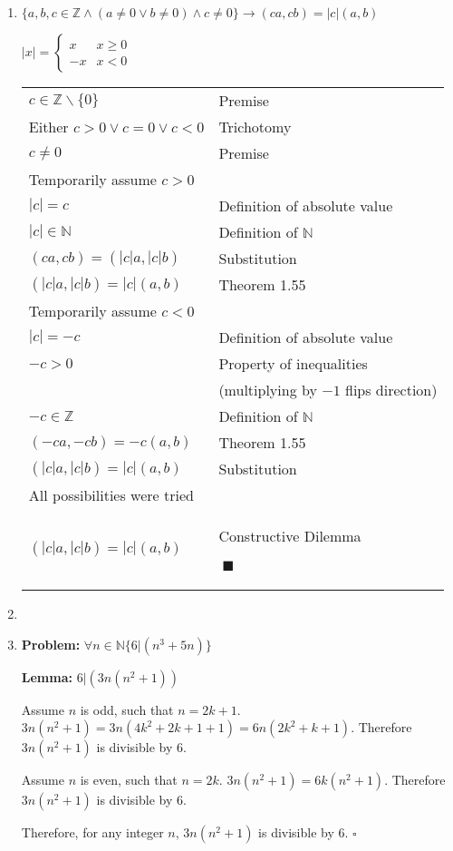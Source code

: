 \documentclass[12pt,letterpaper]{article}
\makeatletter
\newenvironment{proof}{
\mbox{}\vspace*{-1.68\baselineskip}
\begin{longtable}[l]{@{} l l}
}{
\tiny {$~\blacksquare$}
\end{longtable}
}
\makeatother
\begin{document}
\begin{enumerate}[leftmargin=0cm]
\item
$\{a, b, c \in \mathbb{Z} \wedge (a \neq 0 \vee b \neq 0) \wedge c \neq 0\} \rightarrow (ca, cb) = |c|(a, b)$

$|x| = \left \{ \begin{array}{cc} x & x \geq 0 \\ -x & x < 0\end{array} \right. $

\begin{proof}
$c \in \mathbb{Z} \backslash \{0\}$ & Premise \\
Either $c>0 \vee c = 0 \vee c < 0$ & Trichotomy \\
$c \neq 0$ & Premise \\
Temporarily assume $c > 0$ \\
$|c| = c$ & Definition of absolute value \\
$|c| \in \mathbb{N}$ & Definition of $\mathbb{N}$ \\
$(ca, cb) = (|c|a, |c|b)$ & Substitution \\
$(|c|a, |c|b) = |c|(a, b)$ & Theorem 1.55 \\
Temporarily assume $c < 0$ \\
$|c| = -c$ & Definition of absolute value \\
$-c > 0$ & Property of inequalities \\
& (multiplying by $-1$ flips direction) \\
$-c \in \mathbb{Z}$ & Definition of $\mathbb{N}$ \\
$(-ca, -cb) = -c(a, b)$ & Theorem 1.55 \\
$(|c|a, |c|b) = |c|(a, b)$ & Substitution \\
All possibilities were tried \\
$(|c|a, |c|b) = |c|(a, b)$ & Constructive Dilemma
\end{proof}

\item 

\item {\textbf{Problem:} $\forall n \in \mathbb{N} \{ 6|(n^3 + 5n)\}$

\textbf{Lemma:} $6|(3n(n^2 + 1))$

Assume $n$ is odd, such that $n = 2k+1$. $3n(n^2 + 1) = 3n(4k^2 + 2k + 1 + 1) = 6n(2k^2 + k + 1)$. Therefore $3n(n^2 + 1)$ is divisible by $6$.

Assume $n$ is even, such that $n = 2k$. $3n(n^2 + 1) = 6k(n^2 + 1)$. Therefore $3n(n^2 + 1)$ is divisible by $6$.

Therefore, for any integer $n$, $3n(n^2 + 1)$ is divisible by $6$. $\square$

}
\end{enumerate}
\end{document}
